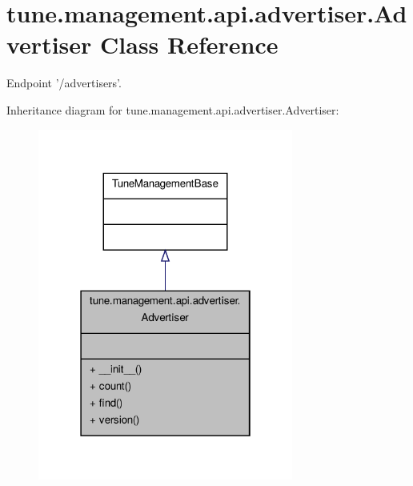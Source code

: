 \hypertarget{classtune_1_1management_1_1api_1_1advertiser_1_1Advertiser}{\section{tune.\-management.\-api.\-advertiser.\-Advertiser Class Reference}
\label{classtune_1_1management_1_1api_1_1advertiser_1_1Advertiser}
}


Endpoint '/advertisers'.  




Inheritance diagram for tune.\-management.\-api.\-advertiser.\-Advertiser\-:
\nopagebreak
\begin{figure}[H]
\begin{center}
\leavevmode
\includegraphics[width=238pt]{classtune_1_1management_1_1api_1_1advertiser_1_1Advertiser__inherit__graph}
\end{center}
\end{figure}


